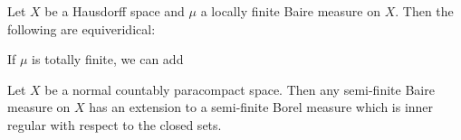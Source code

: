  Let $X$ be a Hausdorff space and $\mu$ a
locally finite Baire measure on $X$.   Then the following are
equiveridical:


\noindent If $\mu$ is totally finite, we can add



 Let $X$ be a
normal countably paracompact space.   Then any semi-finite Baire measure
on $X$ has an extension to a semi-finite Borel measure which is inner
regular with respect to the closed sets.

